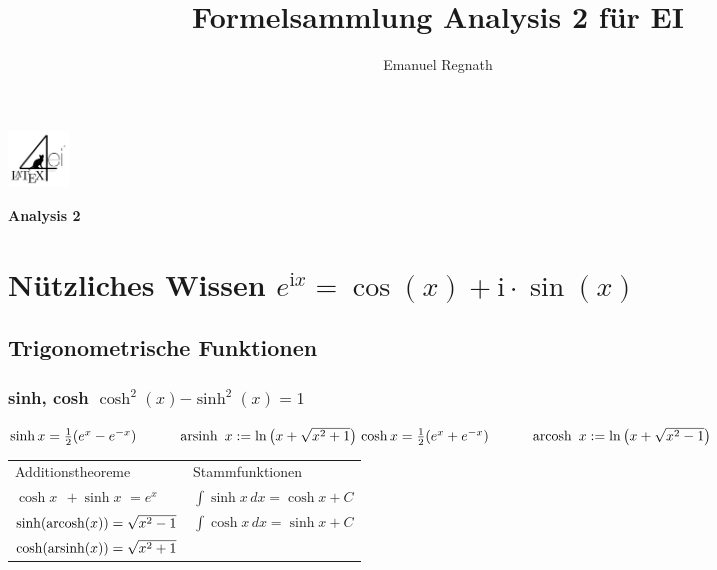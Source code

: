 \documentclass[6pt,a4paper]{scrartcl}
\title{Formelsammlung Analysis 2 für EI}
\author{Emanuel Regnath}
\renewcommand{\emph}[1]{\textbf{#1}}															%
\newcommand{\bs}[1]{\ensuremath{\boldsymbol{#1}}}								%
\renewcommand{\i}{\ensuremath{\mathrm{i}}}										%
\begin{document}
\begin{multicols*}{4}
	\parbox{2.3cm}{
		\includegraphics[height=1.5cm]{./img/Logo.pdf}
	}
	\parbox{4cm}{
		\emph{\Large{Analysis 2}}
	}
\vspace{-2mm} %

\section{Nützliches Wissen $e^{\i x} = \cos (x) + \i \cdot \sin(x)$}
\subsection{Trigonometrische Funktionen}
\subsubsection{sinh, cosh \quad $\cosh^2(x)  \bs - \sinh^2(x) = 1$}
$\sinh x = \frac{1}{2}(e^x -e^{-x}) \qquad \quad \operatorname{arsinh}\ x:= \ln\left(x+\sqrt{x^2+1}\right) \\
\cosh x  = \frac{1}{2}(e^x +e^{-x}) \qquad \quad \operatorname{arcosh}\ x:= \ln\left(x+\sqrt{x^2-1}\right)\\
$\\
\begin{tabular}{ll}
	Additionstheoreme &	Stammfunktionen \\
	$\cosh x \,\; + \sinh x \,\,= e^{x}$ & $\int \sinh x \, dx = \cosh x + C$\\
	$\sinh({\rm arcosh}(x)) = \sqrt{x^2 - 1}$ & $\int \cosh x \, dx = \sinh x + C $\\
	$\cosh({\rm arsinh}(x)) = \sqrt{x^2 + 1}$ \\
\end{tabular}


\end{multicols*}
\end{document}
